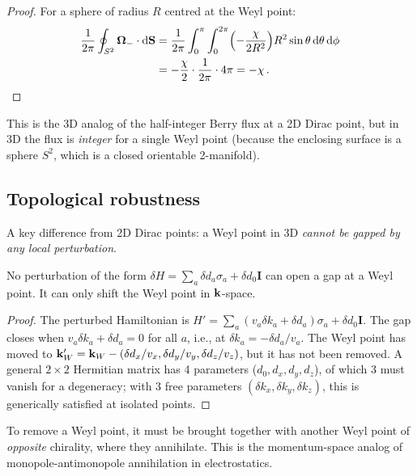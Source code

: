\begin{proof}
For a sphere of radius $R$ centred at the Weyl point:
\begin{align}
  \frac{1}{2\pi}\oint_{S^2}\boldsymbol{\Omega}_-\cdot\mathrm{d}\mathbf{S}
  &= \frac{1}{2\pi}\int_0^\pi\int_0^{2\pi}
  \Bigl(-\frac{\chi}{2R^2}\Bigr)R^2\sin\theta\,\mathrm{d}\theta\,\mathrm{d}\phi
  \notag\\
  &= -\frac{\chi}{2}\cdot\frac{1}{2\pi}\cdot 4\pi = -\chi\,.
\end{align}
\end{proof}

This is the 3D analog of the half-integer Berry flux at a 2D Dirac
point, but in 3D the flux is \emph{integer} for a single Weyl point
(because the enclosing surface is a sphere $S^2$, which is a
closed orientable 2-manifold).

\subsection{Topological robustness}
\label{sec:ch15-robustness}

A key difference from 2D Dirac points: a Weyl point in 3D \emph{cannot
be gapped by any local perturbation}.

\begin{proposition}
  No perturbation of the form $\delta H=\sum_a\delta d_a\sigma_a
  +\delta d_0\mathbf{I}$ can open a gap at a Weyl point.  It can only
  shift the Weyl point in $\mathbf{k}$-space.
\end{proposition}

\begin{proof}
  The perturbed Hamiltonian is
  $H'=\sum_a(v_a\delta k_a+\delta d_a)\sigma_a+\delta d_0\mathbf{I}$.
  The gap closes when $v_a\delta k_a+\delta d_a=0$ for all $a$, i.e.,
  at $\delta k_a=-\delta d_a/v_a$.  The Weyl point has moved to
  $\mathbf{k}_W'=\mathbf{k}_W-(\delta d_x/v_x,\delta d_y/v_y,\delta d_z/v_z)$,
  but it has not been removed.  A general $2\times 2$ Hermitian matrix
  has 4 parameters ($d_0,d_x,d_y,d_z$), of which 3 must vanish for
  a degeneracy; with 3 free parameters $(\delta k_x,\delta k_y,
  \delta k_z)$, this is generically satisfied at isolated points.
\end{proof}

To remove a Weyl point, it must be brought together with another Weyl
point of \emph{opposite} chirality, where they annihilate.  This is the
momentum-space analog of monopole-antimonopole annihilation in
electrostatics.

